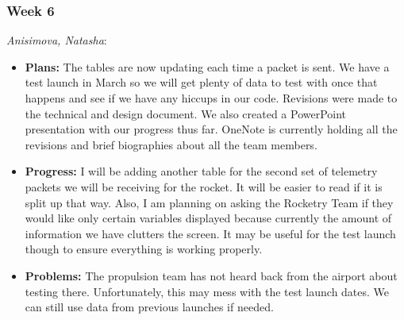 \documentclass[10pt,draftclsnofoot,onecolumn]{IEEEtran}
\newcommand{\subsubsubsection}[1]{
	\hfill\break\textit{#1}:
}
\begin{document}
\subsubsection{Week 6}
\subsubsubsection{Anisimova, Natasha}
\begin{itemize}
	\item \textbf{Plans: }
	The tables are now updating each time a packet is sent. We have a test launch in March so we will get plenty of data to test with once that happens and see if we have any hiccups in our code. Revisions were made to the technical and design document. We also created a PowerPoint presentation with our progress thus far. OneNote is currently holding all the revisions and brief biographies about all the team members.
	\item \textbf{Progress: }
	I will be adding another table for the second set of telemetry packets we will be receiving for the rocket. It will be easier to read if it is split up that way. Also, I am planning on asking the Rocketry Team if they would like only certain variables displayed because currently the amount of information we have clutters the screen. It may be useful for the test launch though to ensure everything is working properly.

	\item \textbf{Problems: }
	The propulsion team has not heard back from the airport about testing there. Unfortunately, this may mess with the test launch dates. We can still use data from previous launches if needed.
\end{itemize}
\end{document}
